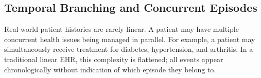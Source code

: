 







\subsection{Temporal Branching and Concurrent Episodes}
\label{subsec:temporal_branching}

Real-world patient histories are rarely linear. A patient may have multiple
concurrent health issues being managed in parallel. For example, a patient may
simultaneously receive treatment for diabetes, hypertension, and arthritis. In
a traditional linear \ac{EHR}, this complexity is flattened; all events appear
chronologically without indication of which episode they belong to.

